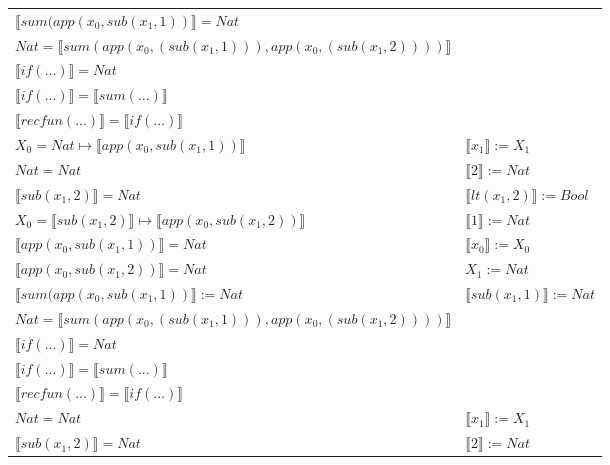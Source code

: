 \begin{exercise}
\begin{description}
\begin{center}
\begin{longtable}{ | l | l | }
                        $ \llbracket sum(app(x_0, sub(x_1,1)) \rrbracket = Nat$ & \\
                        $Nat =  \llbracket sum(app(x_0, (sub(x_1,1))), app(x_0, (sub(x_1,2)))) \rrbracket$ & \\
                        $ \llbracket if(...) \rrbracket = Nat$ & \\
                        $ \llbracket if(...) \rrbracket =  \llbracket sum(...) \rrbracket$ & \\
                        $ \llbracket recfun(...) \rrbracket =  \llbracket if(...) \rrbracket$ & \\
                    \hline
                        $X_0 = Nat \mapsto  \llbracket app(x_0, sub(x_1,1)) \rrbracket$ &   $ \llbracket x_1 \rrbracket := X_1$ \\
                        $Nat = Nat$ & $ \llbracket 2 \rrbracket := Nat$ \\
                        $ \llbracket sub(x_1,2) \rrbracket = Nat$ & $ \llbracket lt(x_1 , 2) \rrbracket := Bool$ \\
                        $X_0 =  \llbracket sub(x_1,2) \rrbracket \mapsto  \llbracket app(x_0, sub(x_1,2)) \rrbracket$ &  $ \llbracket 1 \rrbracket := Nat$ \\
                        $ \llbracket app(x_0, sub(x_1,1)) \rrbracket = Nat$ & $ \llbracket x_0 \rrbracket := X_0$ \\
                        $ \llbracket app(x_0, sub(x_1,2)) \rrbracket = Nat$ & $X_1 := Nat$ \\
                        $ \llbracket sum(app(x_0, sub(x_1,1)) \rrbracket := Nat$ & $ \llbracket sub(x_1,1) \rrbracket := Nat$ \\
                        $Nat =  \llbracket sum(app(x_0, (sub(x_1,1))), app(x_0, (sub(x_1,2)))) \rrbracket$ & \\
                        $ \llbracket if(...) \rrbracket = Nat$ & \\
                        $ \llbracket if(...) \rrbracket =  \llbracket sum(...) \rrbracket$ & \\
                        $ \llbracket recfun(...) \rrbracket =  \llbracket if(...) \rrbracket$ & \\
                    \hline
                        $Nat = Nat$ &  $ \llbracket x_1 \rrbracket := X_1$ \\
                        $ \llbracket sub(x_1,2) \rrbracket = Nat$ & $ \llbracket 2 \rrbracket := Nat$  \\

\end{longtable}
\end{center}
\end{description}
\end{exercise}
